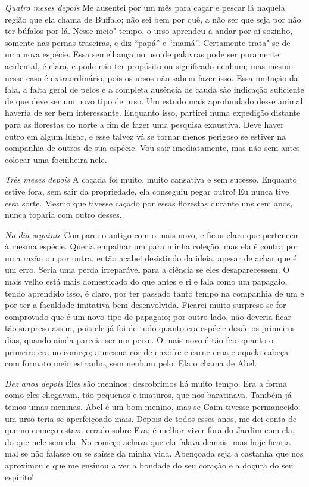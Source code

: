 \textit{Quatro meses depois}  Me ausentei por um mês para caçar e pescar lá naquela
região que ela chama de Buffalo; não sei bem por quê, a não ser que seja por
não ter búfalos por lá. Nesse meio"-tempo, o urso aprendeu a andar por aí
sozinho, somente nas pernas traseiras, e diz “papá” e “mamá”. Certamente
trata"-se de uma nova espécie. Essa semelhança no uso de palavras pode ser
puramente acidental, é claro, e pode não ter propósito ou significado nenhum;
mas mesmo nesse caso é extraordinário, pois os ursos não sabem
fazer isso. Essa imitação da fala, a falta geral de pelos e a completa
ausência de cauda são indicação suficiente de que deve ser um novo tipo de urso.
Um estudo mais aprofundado desse animal haveria de ser bem interessante. Enquanto
isso, partirei numa expedição distante para as florestas do norte a fim de fazer
uma pesquisa exaustiva. Deve haver outro em algum lugar, e esse talvez vá se
tornar menos perigoso se estiver na companhia de outros de sua espécie. Vou
sair imediatamente, mas não sem antes colocar uma focinheira nele.

\textit{Três meses depois}  A caçada foi muito, muito cansativa e sem sucesso.
Enquanto estive fora, sem sair da propriedade, ela conseguiu pegar outro! Eu
nunca tive essa sorte. Mesmo que tivesse caçado por essas florestas
durante uns cem anos, nunca toparia com outro desses.

\textit{No dia seguinte}   Comparei o antigo com o mais novo, e  ficou claro que pertencem
à mesma espécie. Queria empalhar um para minha coleção, mas ela é contra por uma razão ou por outra, 
então acabei desistindo da ideia, apesar de achar
que é um erro. Seria uma perda irreparável para a ciência se eles
desaparecessem. O mais velho está mais domesticado do que antes e ri e fala
como um papagaio, tendo aprendido isso, é claro, por ter passado tanto tempo na
companhia de um e por ter a faculdade imitativa bem desenvolvida. Ficarei muito
surpreso se for comprovado que é um novo tipo de papagaio; por outro lado, não
deveria ficar tão surpreso assim, pois ele já foi de tudo quanto era espécie desde os
primeiros dias, quando ainda parecia ser um peixe. O mais novo é tão feio
quanto o primeiro era no começo; a mesma cor de enxofre e carne crua e aquela
cabeça com formato meio estranho, sem nenhum pelo. Ela o chama de Abel.

\textit{Dez anos depois}   Eles são meninos; descobrimos há muito tempo. Era a
forma como eles chegavam, tão pequenos e imaturos, que nos baratinava. Também já
temos umas meninas. Abel é um bom menino, mas se Caim tivesse permanecido um
urso teria se aperfeiçoado mais. Depois de todos esses anos, me dei conta de que
no começo estava errado sobre Eva; é melhor viver fora do Jardim com ela,
do que nele sem ela. No começo achava que ela falava demais; mas hoje ficaria
mal se não falasse ou se saísse da minha vida. Abençoada seja a castanha que
nos aproximou e que me ensinou a ver a bondade do seu coração e a doçura do seu
espírito!

